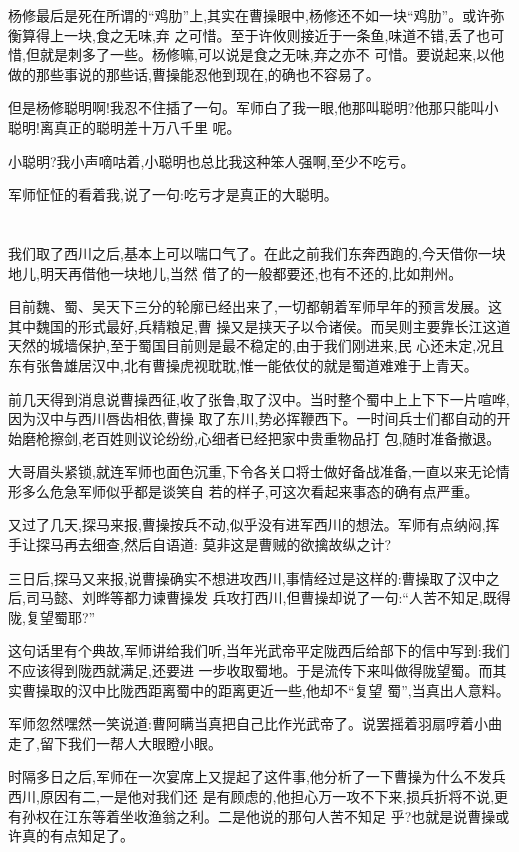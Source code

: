 ﻿\documentclass[12pt,twocolumn]{article}
\begin{document}
杨修最后是死在所谓的``鸡肋''上,其实在曹操眼中,杨修还不如一块``鸡肋''。或许弥衡算得上一块,食之无味,弃
之可惜。至于许攸则接近于一条鱼,味道不错,丢了也可惜,但就是刺多了一些。杨修嘛,可以说是食之无味,弃之亦不
可惜。要说起来,以他做的那些事说的那些话,曹操能忍他到现在,的确也不容易了。

但是杨修聪明啊!我忍不住插了一句。军师白了我一眼,他那叫聪明?他那只能叫小聪明!离真正的聪明差十万八千里
呢。

小聪明?我小声嘀咕着,小聪明也总比我这种笨人强啊,至少不吃亏。

军师怔怔的看着我,说了一句:吃亏才是真正的大聪明。

\section{}

我们取了西川之后,基本上可以喘口气了。在此之前我们东奔西跑的,今天借你一块地儿,明天再借他一块地儿,当然
借了的一般都要还,也有不还的,比如荆州。

目前魏、蜀、吴天下三分的轮廓已经出来了,一切都朝着军师早年的预言发展。这其中魏国的形式最好,兵精粮足,曹
操又是挟天子以令诸侯。而吴则主要靠长江这道天然的城墙保护,至于蜀国目前则是最不稳定的,由于我们刚进来,民
心还未定,况且东有张鲁雄居汉中,北有曹操虎视耽耽,惟一能依仗的就是蜀道难难于上青天。

前几天得到消息说曹操西征,收了张鲁,取了汉中。当时整个蜀中上上下下一片喧哗,因为汉中与西川唇齿相依,曹操
取了东川,势必挥鞭西下。一时间兵士们都自动的开始磨枪擦剑,老百姓则议论纷纷,心细者已经把家中贵重物品打
包,随时准备撤退。

大哥眉头紧锁,就连军师也面色沉重,下令各关口将士做好备战准备,一直以来无论情形多么危急军师似乎都是谈笑自
若的样子,可这次看起来事态的确有点严重。

又过了几天,探马来报,曹操按兵不动,似乎没有进军西川的想法。军师有点纳闷,挥手让探马再去细查,然后自语道:
莫非这是曹贼的欲擒故纵之计?

三日后,探马又来报,说曹操确实不想进攻西川,事情经过是这样的:曹操取了汉中之后,司马懿、刘晔等都力谏曹操发
兵攻打西川,但曹操却说了一句:``人苦不知足,既得陇,复望蜀耶?''

这句话里有个典故,军师讲给我们听,当年光武帝平定陇西后给部下的信中写到:我们不应该得到陇西就满足,还要进
一步收取蜀地。于是流传下来叫做得陇望蜀。而其实曹操取的汉中比陇西距离蜀中的距离更近一些,他却不``复望
蜀'',当真出人意料。

军师忽然嘿然一笑说道:曹阿瞒当真把自己比作光武帝了。说罢摇着羽扇哼着小曲走了,留下我们一帮人大眼瞪小眼。

时隔多日之后,军师在一次宴席上又提起了这件事,他分析了一下曹操为什么不发兵西川,原因有二,一是他对我们还
是有顾虑的,他担心万一攻不下来,损兵折将不说,更有孙权在江东等着坐收渔翁之利。二是他说的那句人苦不知足
乎?也就是说曹操或许真的有点知足了。
\end{document}

